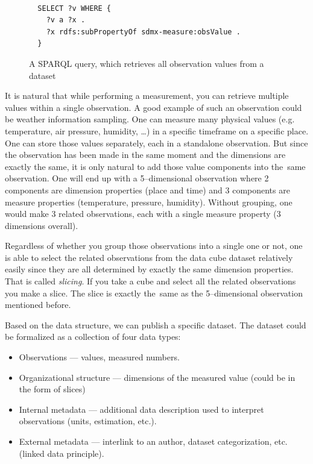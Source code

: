 \begin{figure}
\begin{verbatim}
  
  SELECT ?v WHERE {
    ?v a ?x .
    ?x rdfs:subPropertyOf sdmx-measure:obsValue .
  }

\end{verbatim}
\caption{A SPARQL query, which retrieves all observation values from a dataset}
\label{fig:sparql-obsValue}
\end{figure}

It is natural that while performing a measurement, you can retrieve multiple
values within a single observation. A good example of such an observation could be weather
information sampling. One can measure many physical values (e.g. temperature, air pressure,
humidity, …) in a specific timeframe on a specific place. One can store those values separately,
each in a standalone observation. But since the observation has been made in the same moment
and the dimensions are exactly the same, it is only natural to add those value components into
the~same observation. One will end up with a 5--dimensional observation where 2 components 
are dimension properties (place and time) and 3 components are measure properties
(temperature, pressure, humidity). Without grouping, one would make 3 related observations,
each with a single measure property (3 dimensions overall).

Regardless of whether you group those observations into a single one or not, one is able
to select the related observations from the data cube dataset relatively easily since they
are all determined by exactly the same dimension properties. That is called \emph{slicing}.
If you take a cube and select all the related observations you make a slice. The slice is exactly
the~same as the 5--dimensional observation mentioned before.

Based on the data structure, we can publish a specific dataset. The dataset could be formalized
as a collection of four data types:

\begin{itemize}
\item Observations --- values, measured numbers.
\item Organizational structure --- dimensions of the measured value (could be in the form of slices)
\item Internal metadata --- additional data description used to interpret observations (units, estimation,
etc.).
\item External metadata --- interlink to an author, dataset categorization, etc. (linked data 
principle).
\end{itemize}

